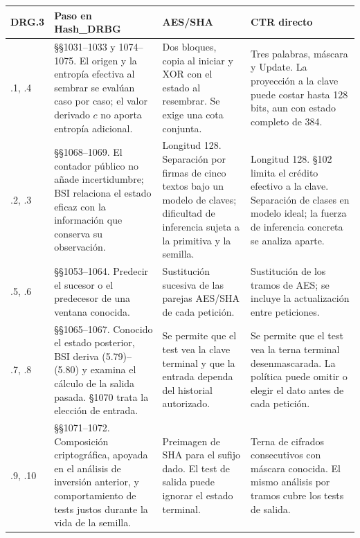 \begin{center}\small
\begin{tabularx}{\linewidth}{@{}lYYY@{}}
\toprule
DRG.3 & Paso en Hash\_DRBG & AES/SHA & CTR directo\\
\midrule
.1, .4 & §§1031--1033 y 1074--1075. El origen y la entropía efectiva al sembrar
se evalúan caso por caso; el valor derivado \(c\) no aporta entropía adicional.
& Dos bloques, copia al iniciar y XOR con el estado al resembrar. Se exige una cota conjunta.
& Tres palabras, máscara y Update. La proyección a la clave puede costar hasta
128 bits, aun con estado completo de 384.\\
.2, .3 & §§1068--1069. El contador público no añade incertidumbre; BSI relaciona
el estado eficaz con la información que conserva su observación.
& Longitud 128. Separación por firmas de cinco textos bajo un modelo de claves;
dificultad de inferencia sujeta a la primitiva y la semilla.
& Longitud 128. §102 limita el crédito efectivo a la clave. Separación de
clases en modelo ideal; la fuerza de inferencia concreta se analiza aparte.\\
.5, .6 & §§1053--1064. Predecir el sucesor o el predecesor de una ventana conocida.
& Sustitución sucesiva de las parejas AES/SHA de cada petición.
& Sustitución de los tramos de AES; se incluye la actualización entre peticiones.\\
.7, .8 & §§1065--1067. Conocido el estado posterior, BSI deriva (5.79)--(5.80)
y examina el cálculo de la salida pasada. §1070 trata la elección de entrada.
& Se permite que el test vea la clave terminal y que la entrada dependa del historial autorizado.
& Se permite que el test vea la terna terminal desenmascarada. La política
puede omitir o elegir el dato antes de cada petición.\\
.9, .10 & §§1071--1072. Composición criptográfica, apoyada en el análisis
de inversión anterior, y comportamiento de tests justos durante la vida de la semilla.
& Preimagen de SHA para el sufijo dado. El test de salida puede ignorar
el estado terminal. & Terna de cifrados consecutivos con máscara conocida.
El mismo análisis por tramos cubre los tests de salida.\\
\bottomrule
\end{tabularx}
\end{center}

